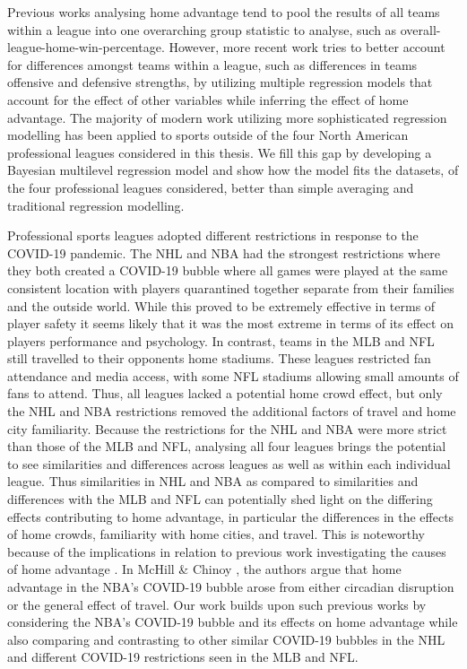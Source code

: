 Previous works analysing home advantage tend to pool the results of all teams within a league into one overarching group statistic to analyse, such as overall-league-home-win-percentage. However, more recent work tries to better account for differences amongst teams within a league, such as differences in teams offensive and defensive strengths, by utilizing multiple regression models that account for the effect of other variables while inferring the effect of home advantage. The majority of modern work utilizing more sophisticated regression modelling has been applied to sports outside of the four North American professional leagues considered in this thesis. We fill this gap by developing a Bayesian multilevel regression model and show how the model fits the datasets, of the four professional leagues considered, better than simple averaging and traditional regression modelling.

Professional sports leagues adopted different restrictions in response to the COVID-19 pandemic. The NHL and NBA had the strongest restrictions where they both created a COVID-19 bubble where all games were played at the same consistent location with players quarantined together separate from their families and the outside world. While this proved to be extremely effective in terms of player safety \cite{nhl2020} \cite{usatoday2020} it seems likely that it was the most extreme in terms of its effect on players performance and psychology. In contrast, teams in the MLB and NFL still travelled to their opponents home stadiums. These leagues restricted fan attendance and media access, with some NFL stadiums allowing small amounts of fans to attend. Thus, all leagues lacked a potential home crowd effect, but only the NHL and NBA restrictions removed the additional factors of travel and home city familiarity. Because the restrictions for the NHL and NBA were more strict than those of the MLB and NFL, analysing all four leagues brings the potential to see similarities and differences across leagues as well as within each individual league. Thus similarities in NHL and NBA as compared to similarities and differences with the MLB and NFL can potentially shed light on the differing effects contributing to home advantage, in particular the differences in the effects of home crowds, familiarity with home cities, and travel. This is noteworthy because of the implications in relation to previous work investigating the causes of home advantage  \cite{Unkelbach2010} \cite{Buraimo2010} \cite{Courneya1992} \cite{Carron2005} \cite{McHill2020} \cite{Garicano2005} \cite{Moskowitz2012}. In McHill \& Chinoy \cite{McHill2020}, the authors argue that home advantage in the NBA's COVID-19 bubble arose from either circadian disruption or the general effect of travel. Our work builds upon such previous works by considering the NBA's COVID-19 bubble and its effects on home advantage while also comparing and contrasting to other similar COVID-19 bubbles in the NHL and different COVID-19 restrictions seen in the MLB and NFL.

